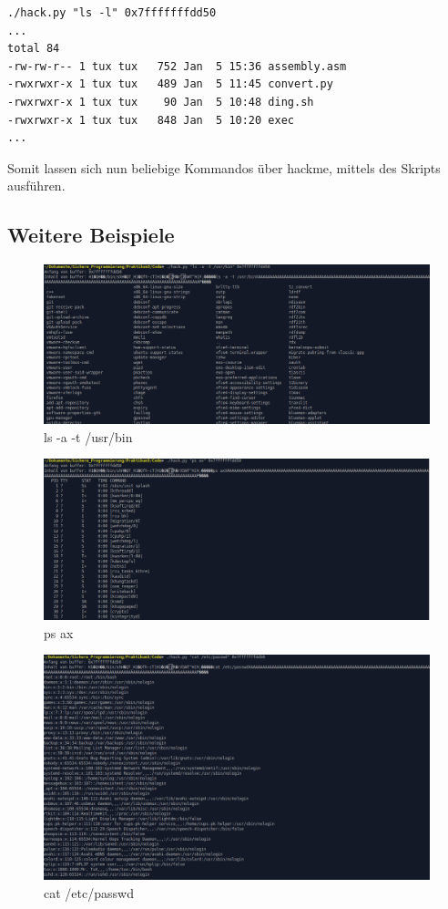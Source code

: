 \documentclass[12pt]{article}
\begin{document}
\begin{lstlisting}
./hack.py "ls -l" 0x7fffffffdd50
...
total 84
-rw-rw-r-- 1 tux tux   752 Jan  5 15:36 assembly.asm
-rwxrwxr-x 1 tux tux   489 Jan  5 11:45 convert.py
-rwxrwxr-x 1 tux tux    90 Jan  5 10:48 ding.sh
-rwxrwxr-x 1 tux tux   848 Jan  5 10:20 exec
...
\end{lstlisting}

Somit lassen sich nun beliebige Kommandos über hackme, mittels des Skripts ausführen.

\subsection{Weitere Beispiele}
\begin{figure}[h!]
	\includegraphics[width=\textwidth]{Pictures/ls-a-t.png}
	\caption{ls -a -t /usr/bin}
	\label{fig:ls}
\end{figure}

\begin{figure}[h!]
	\includegraphics[width=\textwidth]{Pictures/ps.png}
	\caption{ps ax}
	\label{fig:ps}
\end{figure}

\begin{figure}[h!]
	\includegraphics[width=\textwidth]{Pictures/passwd.png}
	\caption{cat /etc/passwd}
	\label{fig:cat}
\end{figure}
\end{document}
